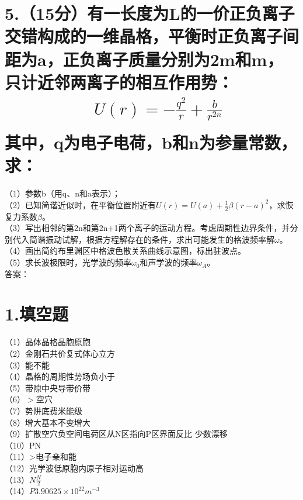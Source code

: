 \documentclass[UTF8]{ctexart}
\begin{document}
\section*{5.（15分）有一长度为L的一价正负离子交错构成的一维晶格，平衡时正负离子间距为a，正负离子质量分别为2m和m，只计近邻两离子的相互作用势：
\begin{equation*}
    \begin{aligned}
        & U(r)=-\frac{q^2}{r}+\frac{b}{r^{2n}}\\
    \end{aligned}
\end{equation*}
其中，q为电子电荷，b和n为参量常数，求：}
（1）参数b（用q、n和a表示）；\\
（2）已知简谐近似时，在平衡位置附近有$U(r)=U(a)+\frac{1}{2}\beta(r-a)^2$，求恢复力系数$\beta$。\\
（3）写出相邻的第2n和第2n+1两个离子的运动方程。考虑周期性边界条件，并分别代入简谐振动试解，根据方程解存在的条件，求出可能发生的格波频率解$\omega$。\\
（4）画出简约布里渊区中格波色散关系曲线示意图，标出驻波点。\\
（5）求长波极限时，光学波的频率$\omega_0$和声学波的频率$\omega_A$。\\


答案：\\
\section*{1.填空题}
（1）晶体晶格晶胞原胞\\
（2）金刚石共价复式体心立方\\
（3）能不能\\
（4）晶格的周期性势场负小于\\
（5）带隙中央导带价带\\
（6）$>$空穴\\
（7）势阱底费米能级\\
（8）增大基本不变增大\\
（9）扩散空穴负空间电荷区从N区指向P区界面反比
少数漂移\\
（10）PN\\
（11）>电子亲和能\\
（12）光学波低原胞内原子相对运动高\\
（13）$N$$\frac{N}{2}$\\
（14）$P$$3.90625\times10^{22}m^{-3}$\\
\end{document}
